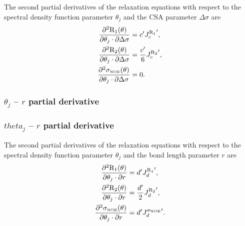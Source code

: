 The second partial derivatives of the relaxation equations with respect to the spectral density function parameter $\theta_j$ and the CSA parameter $\Delta\sigma$ are
\begin{subequations}
\begin{align}
    \frac{\partial^2 \mathrm{R}_1(\theta)}{\partial \theta_j \cdot \partial \Delta\sigma} &= c' {J_c^{\mathrm{R}_1}}',            \label{eq: Ri': d2R1/dmfj.dCSA} \\
    \frac{\partial^2 \mathrm{R}_2(\theta)}{\partial \theta_j \cdot \partial \Delta\sigma} &= \frac{c'}{6} {J_c^{\mathrm{R}_2}}',  \label{eq: Ri': d2R2/dmfj.dCSA} \\
    \frac{\partial^2 \sigma_{\scriptscriptstyle \mathrm{NOE}}(\theta)}{\partial \theta_j \cdot \partial \Delta\sigma} &= 0.                   \label{eq: Ri': d2sigmaNOE/dmfj.dCSA}
\end{align}
\end{subequations}


\begin{latexonly}
    \subsubsection{$\theta_j$ -- $r$ partial derivative}
\end{latexonly}
\begin{htmlonly}
    \subsubsection{$theta_j$ -- $r$ partial derivative}
\end{htmlonly}

The second partial derivatives of the relaxation equations with respect to the spectral density function parameter $\theta_j$ and the bond length parameter $r$ are
\begin{subequations}
\begin{align}
    \frac{\partial^2 \mathrm{R}_1(\theta)}{\partial \theta_j \cdot \partial r} &= d' {J_d^{\mathrm{R}_1}}',               \label{eq: Ri': d2R1/dmfj.dr} \\
    \frac{\partial^2 \mathrm{R}_2(\theta)}{\partial \theta_j \cdot \partial r} &= \frac{d'}{2} {J_d^{\mathrm{R}_2}}',     \label{eq: Ri': d2R2/dmfj.dr} \\
    \frac{\partial^2 \sigma_{\scriptscriptstyle \mathrm{NOE}}(\theta)}{\partial \theta_j \cdot \partial r} &= d' {J_d^{\sigma_{\scriptscriptstyle \mathrm{NOE}}}}'. \label{eq: Ri': d2sigmaNOE/dmfj.dr}
\end{align}
\end{subequations}


